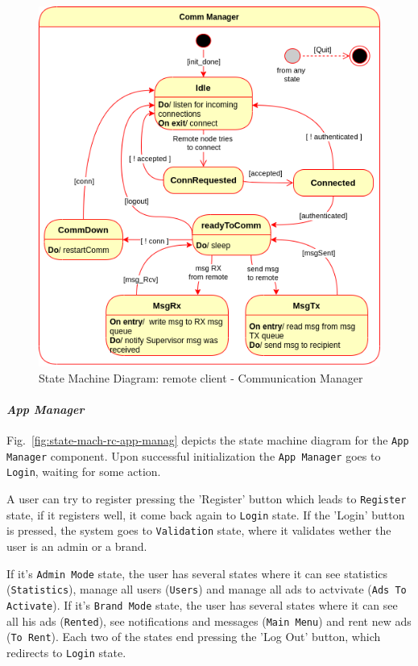 \begin{figure}[htb!]
\centering
    \includegraphics[width=0.7\columnwidth]{./img/state-mach-rc-comm.png}
  \caption{State Machine Diagram: remote client - Communication Manager}%
\label{fig:state-mach-rc-comm}
\end{figure}
%

\paragraph{\emph{App Manager}}
Fig.~\ref{fig:state-mach-rc-app-manag} depicts the state machine diagram for the
\texttt{App Manager} component.
Upon successful initialization the
\texttt{App Manager} goes to \texttt{Login}, waiting for some action. 

A user can try to register pressing the 'Register' button which leads to \texttt{Register} state, if it registers well, it come back again to \texttt{Login} state. 
If the 'Login' button is pressed, the system goes to \texttt{Validation} state, where it validates wether the user is an admin or a brand.

If it's \texttt{Admin Mode} state, the user has several states where it can see statistics (\texttt{Statistics}), manage all users (\texttt{Users}) and manage all ads to actvivate (\texttt{Ads To Activate}).
If it's \texttt{Brand Mode} state, the user has several states where it can see all his ads (\texttt{Rented}), see notifications and messages (\texttt{Main Menu}) and rent new ads (\texttt{To Rent}). 
Each two of the states end pressing the 'Log Out' button, which redirects to \texttt{Login}  state.

